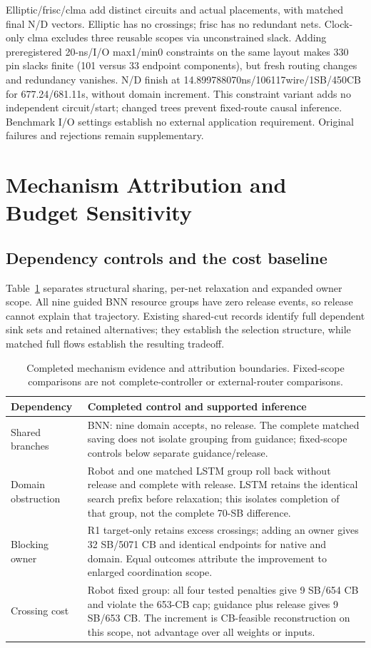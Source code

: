 \documentclass[conference,10pt]{IEEEtran}
\begin{document}
Elliptic/frisc/clma add distinct circuits and actual placements, with matched final N/D vectors. Elliptic has no crossings; frisc has no redundant nets. Clock-only clma excludes three reusable scopes via unconstrained slack. Adding preregistered 20-ns/I/O max1/min0 constraints on the same layout makes 330 pin slacks finite (101 versus 33 endpoint components), but fresh routing changes and redundancy vanishes. N/D finish at 14.899788070ns/106117wire/1SB/450CB for 677.24/681.11s, without domain increment. This constraint variant adds no independent circuit/start; changed trees prevent fixed-route causal inference. Benchmark I/O settings establish no external application requirement. Original failures and rejections remain supplementary.

\section{Mechanism Attribution and Budget Sensitivity}
\subsection{Dependency controls and the cost baseline}
Table~\ref{tab:attribution} separates structural sharing, per-net relaxation and expanded owner scope. All nine guided BNN resource groups have zero release events, so release cannot explain that trajectory. Existing shared-cut records identify full dependent sink sets and retained alternatives; they establish the selection structure, while matched full flows establish the resulting tradeoff.

\begin{table}[t]
\centering\footnotesize\setlength{\tabcolsep}{3pt}
\caption{Completed mechanism evidence and attribution boundaries. Fixed-scope comparisons are not complete-controller or external-router comparisons.}
\label{tab:attribution}
\begin{tabular}{p{}p{}}\hline
Dependency & Completed control and supported inference\\\hline
Shared branches & BNN: nine domain accepts, no release. The complete matched saving does not isolate grouping from guidance; fixed-scope controls below separate guidance/release.\\
Domain obstruction & Robot and one matched LSTM group roll back without release and complete with release. LSTM retains the identical search prefix before relaxation; this isolates completion of that group, not the complete 70-SB difference.\\
Blocking owner & R1 target-only retains excess crossings; adding an owner gives 32 SB/5071 CB and identical endpoints for native and domain. Equal outcomes attribute the improvement to enlarged coordination scope.\\
Crossing cost & Robot fixed group: all four tested penalties give 9 SB/654 CB and violate the 653-CB cap; guidance plus release gives 9 SB/653 CB. The increment is CB-feasible reconstruction on this scope, not advantage over all weights or inputs.\\\hline
\end{tabular}
\end{table}
\end{document}

